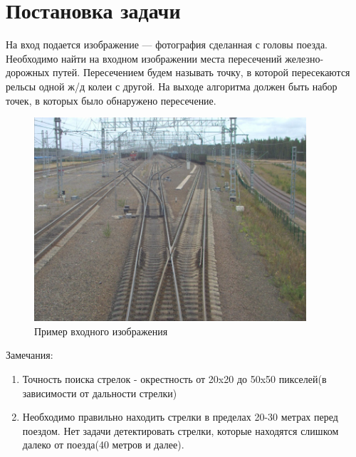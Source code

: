 \newpage
\section{Постановка задачи}
На вход подается изображение — фотография сделанная с головы поезда. Необходимо найти на входном изображении места пересечений железно-дорожных путей. Пересечением будем называть точку, в которой пересекаются рельсы одной ж/д колеи с другой. На выходе алгоритма должен быть набор точек, в которых было обнаружено пересечение.

\begin{figure}[!h]
	\centering
	\includegraphics[width=0.9\textwidth]{pictures/img0002.jpg} 
	\caption{Пример входного изображения}
	\label{fig:input}
\end{figure}

\newpage
Замечания: 
\begin{enumerate}
	\item Точность поиска стрелок - окрестность от 20x20 до 50x50 пикселей(в зависимости от дальности стрелки)
	\item Необходимо правильно находить стрелки в пределах 20-30 метрах перед поездом. Нет задачи детектировать стрелки, которые находятся слишком далеко от поезда(40 метров и далее).
\end{enumerate}

